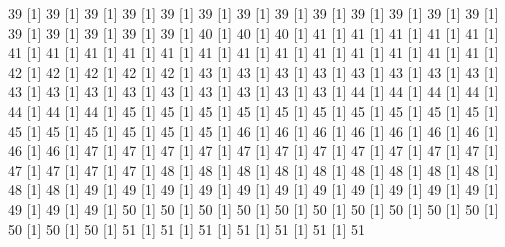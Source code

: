 \documentclass[12pt]{article}
\begin{document}
\begin{Schunk}
\begin{Soutput}
[1] 39%
[1] 39%
[1] 39%
[1] 39%
[1] 39%
[1] 39%
[1] 39%
[1] 39%
[1] 39%
[1] 39%
[1] 39%
[1] 39%
[1] 39%
[1] 39%
[1] 39%
[1] 39%
[1] 39%
[1] 39%
[1] 40%
[1] 40%
[1] 40%
[1] 41%
[1] 41%
[1] 41%
[1] 41%
[1] 41%
[1] 41%
[1] 41%
[1] 41%
[1] 41%
[1] 41%
[1] 41%
[1] 41%
[1] 41%
[1] 41%
[1] 41%
[1] 41%
[1] 41%
[1] 41%
[1] 42%
[1] 42%
[1] 42%
[1] 42%
[1] 42%
[1] 43%
[1] 43%
[1] 43%
[1] 43%
[1] 43%
[1] 43%
[1] 43%
[1] 43%
[1] 43%
[1] 43%
[1] 43%
[1] 43%
[1] 43%
[1] 43%
[1] 43%
[1] 43%
[1] 43%
[1] 44%
[1] 44%
[1] 44%
[1] 44%
[1] 44%
[1] 44%
[1] 44%
[1] 45%
[1] 45%
[1] 45%
[1] 45%
[1] 45%
[1] 45%
[1] 45%
[1] 45%
[1] 45%
[1] 45%
[1] 45%
[1] 45%
[1] 45%
[1] 45%
[1] 45%
[1] 45%
[1] 46%
[1] 46%
[1] 46%
[1] 46%
[1] 46%
[1] 46%
[1] 46%
[1] 46%
[1] 46%
[1] 47%
[1] 47%
[1] 47%
[1] 47%
[1] 47%
[1] 47%
[1] 47%
[1] 47%
[1] 47%
[1] 47%
[1] 47%
[1] 47%
[1] 47%
[1] 47%
[1] 47%
[1] 48%
[1] 48%
[1] 48%
[1] 48%
[1] 48%
[1] 48%
[1] 48%
[1] 48%
[1] 48%
[1] 48%
[1] 48%
[1] 49%
[1] 49%
[1] 49%
[1] 49%
[1] 49%
[1] 49%
[1] 49%
[1] 49%
[1] 49%
[1] 49%
[1] 49%
[1] 49%
[1] 49%
[1] 49%
[1] 50%
[1] 50%
[1] 50%
[1] 50%
[1] 50%
[1] 50%
[1] 50%
[1] 50%
[1] 50%
[1] 50%
[1] 50%
[1] 50%
[1] 50%
[1] 51%
[1] 51%
[1] 51%
[1] 51%
[1] 51%
[1] 51%
[1] 51%

\end{Soutput}
\end{Schunk}
\end{document}
